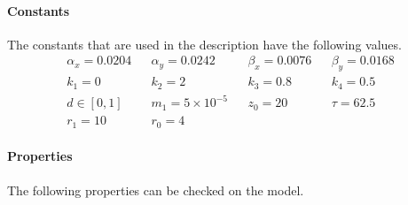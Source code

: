 \documentclass[envcountsect]{llncs}
\begin{document}
\paragraph{Constants} The constants that are used in the description have the
following values. 
\begin{align*}
\alpha_x = 0.0204 && \alpha_y = 0.0242 && \beta_x = 0.0076 && \beta_y = 0.0168
\\
k_1 = 0 && k_2 = 2 && k_3 = 0.8 && k_4 = 0.5 \\
d\in [0,1] && m_1 = 5\times 10^{-5} && z_0 = 20 && \tau = 62.5 \\
r_1 = 10 && r_0 = 4
\end{align*}
\paragraph{Properties}
The following properties can be checked on the model. 
\end{document}

